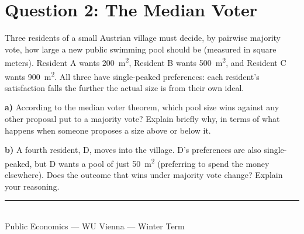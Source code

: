 \documentclass[11pt]{article}
\newcommand{\qpart}[1]{\par\vspace{0.4em}\noindent\textbf{#1}\quad}
\begin{document}
\section*{Question 2: The Median Voter}

Three residents of a small Austrian village must decide, by pairwise majority vote, how large a new public swimming pool should be (measured in square meters). Resident A wants 200~m\textsuperscript{2}, Resident B wants 500~m\textsuperscript{2}, and Resident C wants 900~m\textsuperscript{2}. All three have single-peaked preferences: each resident's satisfaction falls the further the actual size is from their own ideal.

\qpart{a)} According to the median voter theorem, which pool size wins against any other proposal put to a majority vote? Explain briefly why, in terms of what happens when someone proposes a size above or below it.

\qpart{b)} A fourth resident, D, moves into the village. D's preferences are also single-peaked, but D wants a pool of just 50~m\textsuperscript{2} (preferring to spend the money elsewhere). Does the outcome that wins under majority vote change? Explain your reasoning.

\vspace{1.5em}
\noindent\textcolor{wugray}{\rule{\linewidth}{0.4pt}}\\
{\footnotesize\color{wugray} Public Economics --- WU Vienna --- Winter Term}
\end{document}
